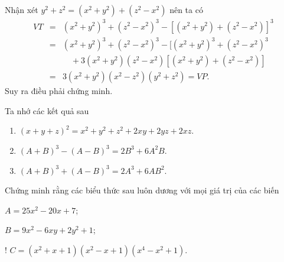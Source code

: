 \begin{vd}
{\begin{enumerate}
		Nhận xét $ y^{2}+z^{2}=(x^{2}+y^{2})+(z^{2}-x^{2}) $ nên ta có
		\begin{eqnarray*}
			VT&=&(x^{2}+y^{2})^{3}+(z^{2}-x^{2})^{3}-[(x^{2}+y^{2})+(z^{2}-x^{2})]^{3}\\
			&=&(x^{2}+y^{2})^{3}+(z^{2}-x^{2})^{3}-[(x^{2}+y^{2})^{3}+(z^{2}-x^{2})^{3}\\
			&&\quad+3(x^{2}+y^{2})(z^{2}-x^{2})[(x^{2}+y^{2})+(z^{2}-x^{2})]\\
			&=&3(x^{2}+y^{2})(x^{2}-z^{2})(y^{2}+z^{2})=VP.
		\end{eqnarray*}
		Suy ra điều phải chứng minh.
	\end{enumerate}
}
\begin{note}
Ta nhớ các kết quả sau
\begin{enumerate}[1)]
	\item $ (x+y+z)^{2}=x^{2}+y^{2}+z^{2}+2xy+2yz+2xz $.
	\item $ (A+B)^{3}-(A-B)^{3}=2B^{3}+6A^{2}B $.
	\item $ (A+B)^{3}+(A-B)^{3}=2A^{3}+6AB^{2} $.
\end{enumerate}
\end{note}
\end{vd}
\begin{vd}
	Chứng minh rằng các biểu thức sau luôn dương với mọi giá trị của các biến
	\begin{enumEX}{2}
		\item $ A=25x^{2}-20x+7 $;
		\item $ B=9x^{2}-6xy+2y^{2}+1 $;
		\item! $ C=(x^{2}+x+1)(x^{2}-x+1)(x^{4}-x^{2}+1) $.
	\end{enumEX}
\end{vd}
